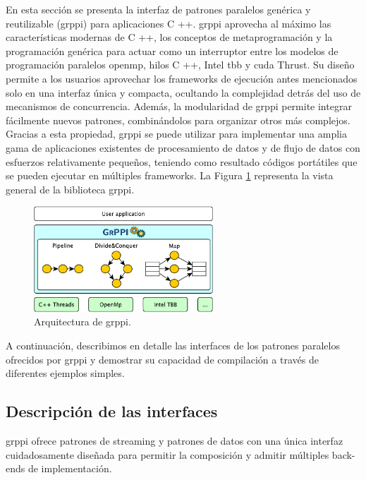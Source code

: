 En esta sección se presenta la interfaz de patrones paralelos genérica y reutilizable (\acrshort{grppi}) para aplicaciones C ++. \acrshort{grppi} aprovecha al máximo las características modernas de C ++, los conceptos de metaprogramación y la programación genérica para actuar como un interruptor entre los modelos de programación paralelos \acrshort{openmp}, hilos C ++, Intel \acrshort{tbb} y \acrshort{cuda} Thrust. Su diseño permite a los usuarios aprovechar los frameworks de ejecución antes mencionados solo en una interfaz única y compacta, ocultando la complejidad detrás del uso de mecanismos de concurrencia. Además, la modularidad de \acrshort{grppi} permite integrar fácilmente nuevos patrones, combinándolos para organizar otros más complejos. Gracias a esta propiedad, \acrshort{grppi} se puede utilizar para implementar una amplia gama de aplicaciones existentes de procesamiento de datos y de flujo de datos con esfuerzos relativamente pequeños, teniendo como resultado códigos portátiles que se pueden ejecutar en múltiples frameworks. La Figura \ref{fig:chap3:grppi} representa la vista general de la biblioteca \acrshort{grppi}.

\vspace{0.35cm}
\begin{figure}[htb]
    \centering
    \includegraphics[width=0.60\textwidth]{figures/grppi.pdf}
    \caption{Arquitectura de \acrshort{grppi}.}
    \label{fig:chap3:grppi}
    \end{figure}
    \vspace{0.35cm}

A continuación, describimos en detalle las interfaces de los patrones paralelos ofrecidos por \acrshort{grppi} y demostrar su capacidad de compilación a través de diferentes ejemplos simples.

\subsection{Descripción de las interfaces}

\acrshort{grppi} ofrece patrones de streaming y patrones de datos con una única interfaz cuidadosamente diseñada para permitir la composición y admitir múltiples back-ends de implementación.

